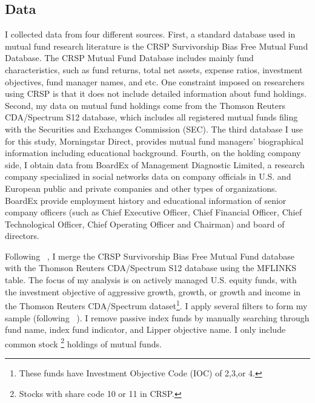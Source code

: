 \documentclass[11pt]{article}
\begin{document}
\begin{doublespace}
\section{Data}
I collected data from four different sources. First, a standard database used in mutual fund research literature is the CRSP Survivorship Bias Free Mutual Fund Database. The CRSP Mutual Fund Database includes mainly fund characteristics, such as fund returns, total net assets, expense ratios, investment objectives, fund manager names, and etc. One constraint imposed on researchers using CRSP is that it does not include detailed information about fund holdings. 
Second, my data on mutual fund holdings come from the Thomson Reuters CDA/Spectrum S12 database, which includes all registered mutual funds filing with the Securities and Exchanges Commission (SEC). The third database I use for this study, Morningstar Direct, provides mutual fund managers' biographical information including educational background. Fourth, on the holding company side, I obtain data from BoardEx of Management Diagnostic Limited, a research company specialized in social networks data on company officials in U.S. and European public and private companies and other types of organizations. BoardEx provide employment history and educational information of senior company officers (such as Chief Executive Officer, Chief Financial Officer, Chief Technological Officer, Chief Operating Officer and Chairman) and board of directors. 

Following ~\cite{wermers2000mutual}, I merge the CRSP Survivorship Bias Free Mutual Fund database with the Thomson Reuters CDA/Spectrum S12 database using the MFLINKS table. The focus of my analysis is on actively managed U.S. equity funds, with the investment objective of aggressive growth, growth, or growth and income in the Thomson Reuters CDA/Spectrum dataset\footnote{These funds have Investment Objective Code (IOC) of 2,3,or 4.}. 
I apply several filters to form my sample (following ~\cite{kacperczyk2006unobserved}). I remove passive index funds by manually searching through fund name, index fund indicator, and Lipper objective name. I only include common stock \footnote{Stocks with share code 10 or 11 in CRSP. } holdings of mutual funds. 


\end{doublespace}
\end{document}
